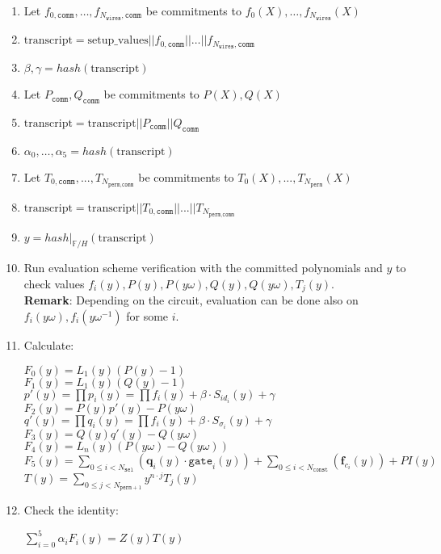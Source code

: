 \begin{enumerate}
	\item Let $f_{0, \texttt{comm}}, \dots, f_{N_{\texttt{wires}}, \texttt{comm}}$ be commitments to $f_{0}(X), \dots, f_{N_{\texttt{wires}}}(X)$
	\item $\text{transcript} = \text{setup\_values} || f_{0, \texttt{comm}} || \dots || f_{N_{\texttt{wires}}, \texttt{comm}}$
	\item $\beta, \gamma = hash(\text{transcript})$
	\item Let $P_{\texttt{comm}}, Q_{\texttt{comm}}$ be commitments to $P(X), Q(X)$
	\item $\text{transcript} = \text{transcript} || P_{\texttt{comm}} || Q_{\texttt{comm}}$
	\item $\alpha_0, \dots, \alpha_5 = hash(\text{transcript})$
	\item Let $T_{0, \texttt{comm}}, ..., T_{N_{\texttt{perm}, \texttt{comm}}}$ be commitments to $T_0(X), ..., T_{N_{\texttt{perm}}}(X)$ 
	\item $\text{transcript} = \text{transcript} || T_{0, \texttt{comm}} || ... || T_{N_{\texttt{perm}, \texttt{comm}}}$
	\item $y = hash|_{\mathbb{F}/H}(\text{transcript})$
	\item Run evaluation scheme verification with the committed polynomials and $y$ to check values 
		$f_i(y), P(y), P(y\omega), Q(y), Q(y\omega), T_j(y)$.  \\
		\textbf{Remark}: Depending on the circuit, evaluation can be done also on $f_i(y\omega), f_i(y\omega^{-1})$ for some $i$.
	\item Calculate:
	\begin{center}
		$F_0(y) = L_1(y)(P(y) - 1)$ \\
		$F_1(y) = L_1(y)(Q(y) - 1)$ \\
		$p'(y) = \prod p_i(y) = \prod f_i(y) + \beta \cdot S_{id_i}(y) + \gamma$ \\
		$F_2(y) = P(y)p'(y) - P(y\omega)$ \\
		$q'(y) = \prod q_i(y) = \prod f_i(y) + \beta \cdot S_{\sigma_i}(y) + \gamma$ \\
		$F_3(y) = Q(y)q'(y) - Q(y\omega)$ \\
		$F_4(y) = L_n(y)(P(y\omega) - Q(y\omega))$ \\
		$F_5(y) = \sum\limits_{0 \leq i < N_{\texttt{sel}}} (\textbf{q}_{i}(y) \cdot \texttt{gate}_i(y))
			+ \sum\limits_{0 \leq i < N_{\texttt{const}}}(\textbf{f}_{c_i}(y)) + PI(y)$ \\
		$T(y) = \sum\limits_{0 \leq j < N_{\texttt{perm} + 1}}y^{n \cdot j}T_j(y)$
	\end{center}
	\item Check the identity:
	\begin{center}
		$\sum\limits_{i = 0}^5\alpha_iF_i(y) = Z(y)T(y)$
	\end{center}
\end{enumerate}